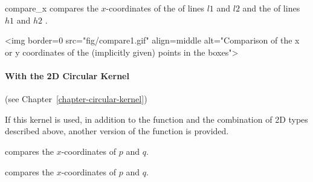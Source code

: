 \begin{ccRefFunction}{compare_x}
        {compares the $x$-coordinates of the  of lines $l1$
         and $l2$ and  the  of lines $h1$ and $h2$%
         .}

\begin{ccHtmlOnly}
<img border=0 src="fig/compare1.gif" align=middle alt="Comparison of the x 
or y coordinates of the (implicitly given) points in the boxes">
\end{ccHtmlOnly} 

\paragraph{With the 2D Circular Kernel} (see Chapter~\ref{chapter-circular-kernel}) 


If this kernel is used, in addition to the function and the
combination of 2D types described above, another version of the function
is provided.

{compares the $x$-coordinates of $p$ and $q$.}

{compares the $x$-coordinates of $p$ and $q$.}


\ccSeeAlso
{} \\
 \\
 \\
 \\
 \\
 \\
 \\

\end{ccRefFunction}

